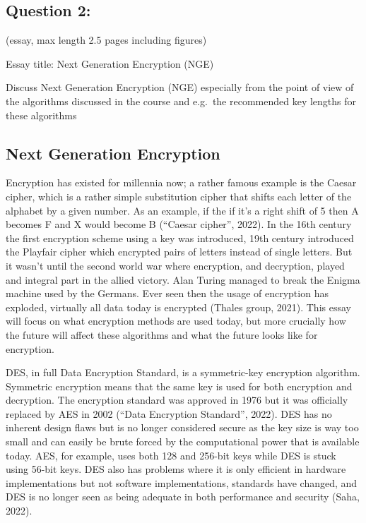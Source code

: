 \documentclass[11pt]{article}
\begin{document}
    \hypertarget{question-2}{%
\subsection{Question 2:}\label{question-2}}

(essay, max length 2.5 pages including figures)

Essay title: Next Generation Encryption (NGE)

Discuss Next Generation Encryption (NGE) especially from the point of
view of the algorithms discussed in the course and e.g.~the recommended
key lengths for these algorithms

    \hypertarget{next-generation-encryption}{%
\subsection{Next Generation
Encryption}\label{next-generation-encryption}}

Encryption has existed for millennia now; a rather famous example is the
Caesar cipher, which is a rather simple substitution cipher that shifts
each letter of the alphabet by a given number. As an example, if the if
it's a right shift of 5 then A becomes F and X would become B (``Caesar
cipher'', 2022). In the 16th century the first encryption scheme using a
key was introduced, 19th century introduced the Playfair cipher which
encrypted pairs of letters instead of single letters. But it wasn't
until the second world war where encryption, and decryption, played and
integral part in the allied victory. Alan Turing managed to break the
Enigma machine used by the Germans. Ever seen then the usage of
encryption has exploded, virtually all data today is encrypted (Thales
group, 2021). This essay will focus on what encryption methods are used
today, but more crucially how the future will affect these algorithms
and what the future looks like for encryption.

DES, in full Data Encryption Standard, is a symmetric-key encryption
algorithm. Symmetric encryption means that the same key is used for both
encryption and decryption. The encryption standard was approved in 1976
but it was officially replaced by AES in 2002 (``Data Encryption
Standard'', 2022). DES has no inherent design flaws but is no longer
considered secure as the key size is way too small and can easily be
brute forced by the computational power that is available today. AES,
for example, uses both 128 and 256-bit keys while DES is stuck using
56-bit keys. DES also has problems where it is only efficient in
hardware implementations but not software implementations, standards
have changed, and DES is no longer seen as being adequate in both
performance and security (Saha, 2022).
\end{document}
